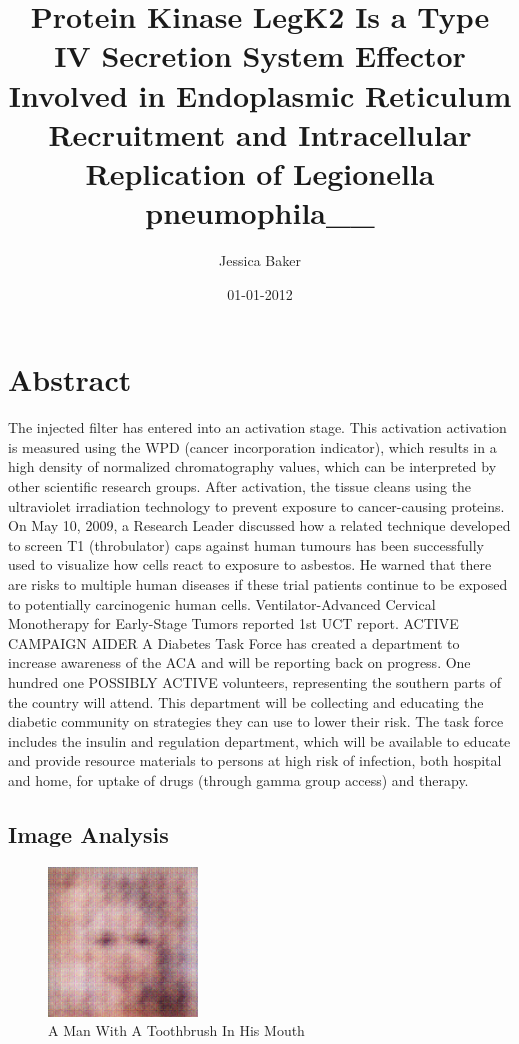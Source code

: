 \documentclass{article}%
\title{Protein Kinase LegK2 Is a Type IV Secretion System Effector Involved in Endoplasmic Reticulum Recruitment and Intracellular Replication of Legionella pneumophila\_\_}%
\author{Jessica Baker}%
\affil{Department of Orthopedic Surgery, Xinhua Hospital, Shanghai Jiaotong University, School of Medicine, Shanghai 200092, P.R. China}%
\date{01{-}01{-}2012}%
\begin{document}
%
\normalsize%
\maketitle%
\section{Abstract}%
\label{sec:Abstract}%
The injected filter has entered into an activation stage. This activation activation is measured using the WPD (cancer incorporation indicator), which results in a high density of normalized chromatography values, which can be interpreted by other scientific research groups. After activation, the tissue cleans using the ultraviolet irradiation technology to prevent exposure to cancer{-}causing proteins. On May 10, 2009, a Research Leader discussed how a related technique developed to screen T1 (throbulator) caps against human tumours has been successfully used to visualize how cells react to exposure to asbestos. He warned that there are risks to multiple human diseases if these trial patients continue to be exposed to potentially carcinogenic human cells.\newline%
Ventilator{-}Advanced Cervical Monotherapy for Early{-}Stage Tumors reported 1st UCT report.\newline%
ACTIVE CAMPAIGN AIDER\newline%
A Diabetes Task Force has created a department to increase awareness of the ACA and will be reporting back on progress. One hundred one POSSIBLY ACTIVE volunteers, representing the southern parts of the country will attend. This department will be collecting and educating the diabetic community on strategies they can use to lower their risk. The task force includes the insulin and regulation department, which will be available to educate and provide resource materials to persons at high risk of infection, both hospital and home, for uptake of drugs (through gamma group access) and therapy.

%
\subsection{Image Analysis}%
\label{subsec:ImageAnalysis}%


\begin{figure}[h!]%
\centering%
\includegraphics[width=150px]{500_fake_images/samples_5_254.png}%
\caption{A Man With A Toothbrush In His Mouth}%
\end{figure}

%
\end{document}
